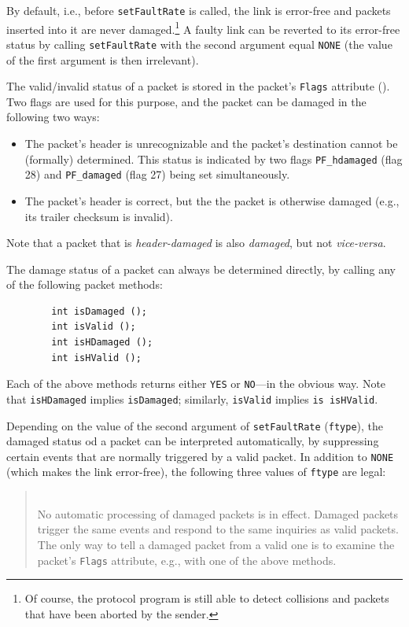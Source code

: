 By default, i.e., before {\tt setFaultRate} is called, the link is error-free
and packets inserted into it are never
damaged.\footnote{Of course, the protocol program is still able to detect
collisions and packets that have been aborted by the sender.}
A faulty link can be reverted to its error-free status by calling
{\tt setFaultRate} with the second argument equal {\tt NONE} (the value of
the first argument is then irrelevant).

The valid/invalid status of a packet is stored in the packet's
{\tt Flags} attribute ().
Two flags are used for this purpose, and the packet can be damaged in the
following two ways:
\begin{itemize}
\item
The packet's header is unrecognizable and the packet's destination cannot
be (formally) determined.
This status is indicated by two flags {\tt PF\_hdamaged} (flag 28) and
{\tt PF\_damaged} (flag 27) being set simultaneously.
\item
The packet's header is correct, but the the packet is otherwise damaged
(e.g., its trailer checksum is invalid).
\end{itemize}
Note that a packet that is {\em header-damaged\/} is also {\em damaged}, but
not {\em vice-versa}.

The damage status of a packet can always be determined directly, by calling
any of the following packet methods:
\begin{verbatim}
        int isDamaged ();
        int isValid ();
        int isHDamaged ();
        int isHValid ();
\end{verbatim}
Each of the above methods returns either {\tt YES} or {\tt NO}---in the
obvious way.
Note that {\tt isHDamaged} implies {\tt isDamaged}; similarly, {\tt isValid}
implies {\tt is isHValid}.

Depending on the value of the second argument of {\tt setFaultRate}
({\tt ftype}),
the damaged status od a packet can be interpreted automatically, by
suppressing certain events that are normally triggered by a valid packet.
In addition to {\tt NONE} (which makes the link error-free), the following
three values of {\tt ftype} are legal:

\medskip

\begin{quote}
\noindent{}\\ \hspace{0in}
No automatic processing of damaged packets is in effect.
Damaged packets trigger the same events and respond to the same inquiries
as valid packets.
The only way to tell a damaged packet from a valid one is to examine the
packet's {\tt Flags} attribute, e.g., with one of the above methods.
\end{quote}

